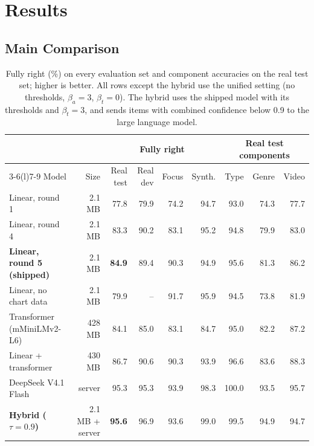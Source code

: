 \documentclass[11pt]{article}
\begin{document}
\section{Results}
\label{sec:results}

\subsection{Main Comparison}
\label{sec:main}

\begin{table}[t]
  \centering
  \small
  \caption{Fully right (\%) on every evaluation set and component accuracies on the real test set; higher is better. All rows except the hybrid use the unified setting (no thresholds, $\beta_a = 3$, $\beta_t = 0$). The hybrid uses the shipped model with its thresholds and $\beta_t = 3$, and sends items with combined confidence below 0.9 to the large language model.}
  \label{tab:main}
  \begin{tabular}{@{}lrrrrrrrr@{}}
    \toprule
     & & \multicolumn{4}{c}{Fully right} & \multicolumn{3}{c}{Real test components} \\
    \cmidrule(lr){3-6}\cmidrule(l){7-9}
    Model & Size & Real test & Real dev & Focus & Synth. & Type & Genre & Video \\
    \midrule
    Linear, round 1 & 2.1 MB & 77.8 & 79.9 & 74.2 & 94.7 & 93.0 & 74.3 & 77.7 \\
    Linear, round 4 & 2.1 MB & 83.3 & 90.2 & 83.1 & 95.2 & 94.8 & 79.9 & 83.0 \\
    \textbf{Linear, round 5 (shipped)} & 2.1 MB & \textbf{84.9} & 89.4 & 90.3 & 94.9 & 95.6 & 81.3 & 86.2 \\
    Linear, no chart data & 2.1 MB & 79.9 & -- & 91.7 & 95.9 & 94.5 & 73.8 & 81.9 \\
    Transformer (mMiniLMv2-L6) & 428 MB & 84.1 & 85.0 & 83.1 & 84.7 & 95.0 & 82.2 & 87.2 \\
    Linear + transformer & 430 MB & 86.7 & 90.6 & 90.3 & 93.9 & 96.6 & 83.6 & 88.3 \\
    \midrule
    DeepSeek V4.1 Flash & server & 95.3 & 95.3 & 93.9 & 98.3 & 100.0 & 93.5 & 95.7 \\
    \textbf{Hybrid ($\tau = 0.9$)} & 2.1 MB + server & \textbf{95.6} & 96.9 & 93.6 & 99.0 & 99.5 & 94.9 & 94.7 \\
    \bottomrule
  \end{tabular}
\end{table}
\end{document}
